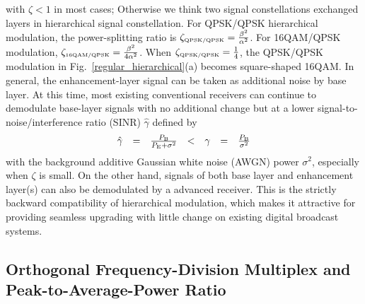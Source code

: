 \documentclass[10pt,fleqn, twocolumn]{IEEEtran}
\begin{document}
\noindent with $\zeta < 1$ in most cases; Otherwise we think two
signal constellations exchanged layers in hierarchical signal
constellation. For QPSK/QPSK hierarchical modulation, the
power-splitting ratio is $\zeta_{\mbox{\tiny QPSK/QPSK}}=
\frac{\beta^{2}}{\alpha^2}$. For 16QAM/QPSK modulation,
$\zeta_{\mbox{\tiny 16QAM/QPSK}}= \frac{\beta^{2}}{4\alpha^2}$.
When $\zeta_{\mbox{\tiny QPSK/QPSK}}=\frac{1}{4}$, the QPSK/QPSK
modulation in Fig.~\ref{regular_hierarchical}(a) becomes
square-shaped 16QAM. In general, the enhancement-layer signal can
be taken as additional noise by base layer. At this time, most
existing conventional receivers can continue to demodulate
base-layer signals with no additional change but at a lower
signal-to-noise/interference ratio (SINR) $\hat{\gamma}$ defined
by
\begin{equation}
\begin{array}{rcccccl}
\hat{\gamma}& = & \frac{P_{\rm B}}{P_{\rm
E}+\sigma^2}&<&\gamma&=&\frac{P_{\rm B}}{\sigma^2}
\end{array}\label{SINR}
\end{equation}
\noindent with the background additive Gaussian white noise (AWGN)
power $\sigma^2$,  especially when $\zeta$ is small. On the other
hand, signals of both base layer and enhancement layer(s) can also
be demodulated by a advanced receiver. This is the strictly
backward compatibility of hierarchical modulation, which makes it
attractive for providing seamless upgrading with little change on
existing digital broadcast systems.

\subsection{Orthogonal Frequency-Division Multiplex and Peak-to-Average-Power Ratio}
\end{document}
